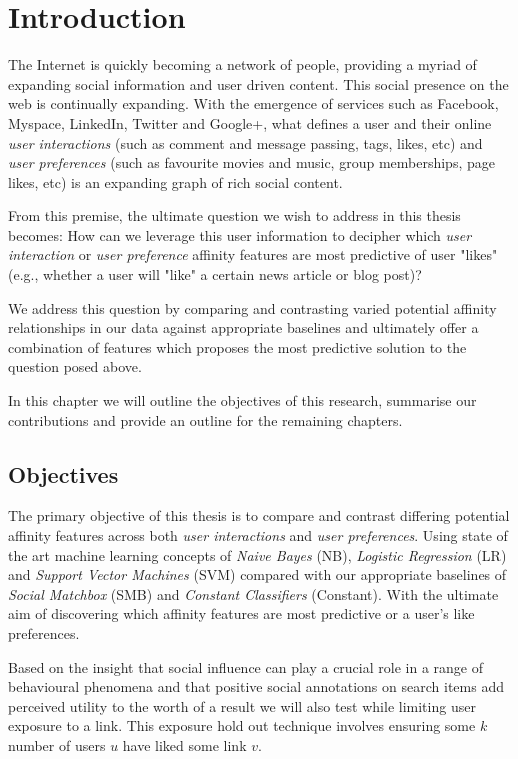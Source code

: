 
\chapter{Introduction}
\label{cha:intro}

The Internet is quickly becoming a network of people, providing a myriad of expanding social information and user driven content. 
This social presence on the web is continually expanding. With the emergence of services such as Facebook, Myspace, LinkedIn, Twitter 
and Google+, what defines a user and their online \emph{user interactions} (such as comment and message passing, tags, likes, etc) and \emph{user preferences} 
(such as favourite movies and music, group memberships, page likes, etc) is an expanding graph of rich social content. 

From this premise, the ultimate question we wish to address in this thesis becomes: 
How can we leverage this user information to decipher which \emph{user interaction} or \emph{user preference} affinity features 
are most predictive of user "likes" (e.g., whether a user will "like" a certain news article or blog post)? 

We address this question by comparing and contrasting varied potential affinity relationships in our data against appropriate 
baselines and ultimately offer a combination of features which proposes the most predictive solution to the question posed above.

In this chapter we will outline the objectives of this research, summarise our contributions and provide an outline for the remaining
chapters.

\section{Objectives}
\label{sec:objectives}

The primary objective of this thesis is to compare and contrast differing potential affinity features across both \emph{user interactions} and 
\emph{user preferences}. Using state of the art machine learning concepts of \emph{Naive Bayes} (NB), \emph{Logistic Regression} (LR) 
and \emph{Support Vector Machines} (SVM) compared with our appropriate baselines of \emph{Social Matchbox} (SMB) and \emph{Constant Classifiers} (Constant). 
With the ultimate aim of discovering which affinity features are most predictive or a user's like preferences.

Based on the insight that social influence can play a crucial role in a range of behavioural phenomena \cite{grano,watts} and that
positive social annotations on search items add perceived utility to the worth of a result \cite{pantel} we will 
also test while limiting user exposure to a link. This exposure hold out technique involves ensuring some $k$ number of users $u$ have 
liked some link $v$.

